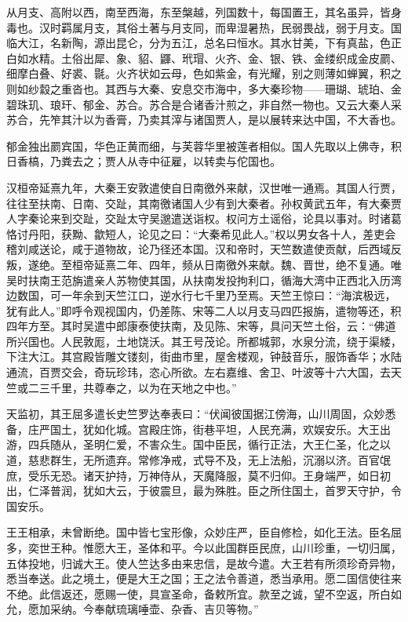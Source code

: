 \documentclass[12pt,UTF8]{ctexbook}
\begin{document}
从月支、高附以西，南至西海，东至槃越，列国数十，每国置王，其名虽异，皆身毒也。汉时羁属月支，其俗土著与月支同，而卑湿暑热，民弱畏战，弱于月支。国临大江，名新陶，源出昆仑，分为五江，总名曰恒水。其水甘美，下有真盐，色正白如水精。土俗出犀、象、貂、鼲、玳瑁、火齐、金、银、铁、金缕织成金皮罽、细摩白叠、好裘、毾。火齐状如云母，色如紫金，有光耀，别之则薄如蝉翼，积之则如纱縠之重沓也。其西与大秦、安息交市海中，多大秦珍物——珊瑚、琥珀、金碧珠玑、琅玕、郁金、苏合。苏合是合诸香汁煎之，非自然一物也。又云大秦人采苏合，先笮其汁以为香膏，乃卖其滓与诸国贾人，是以展转来达中国，不大香也。

郁金独出罽宾国，华色正黄而细，与芙蓉华里被莲者相似。国人先取以上佛寺，积日香槁，乃粪去之；贾人从寺中征雇，以转卖与佗国也。

汉桓帝延熹九年，大秦王安敦遣使自日南徼外来献，汉世唯一通焉。其国人行贾，往往至扶南、日南、交趾，其南徼诸国人少有到大秦者。孙权黄武五年，有大秦贾人字秦论来到交趾，交趾太守吴邈遣送诣权。权问方土谣俗，论具以事对。时诸葛恪讨丹阳，获黝、歙短人，论见之曰：“大秦希见此人。”权以男女各十人，差吏会稽刘咸送论，咸于道物故，论乃径还本国。汉和帝时，天竺数遣使贡献，后西域反叛，遂绝。至桓帝延熹二年、四年，频从日南徼外来献。魏、晋世，绝不复通。唯吴时扶南王范旃遣亲人苏物使其国，从扶南发投拘利口，循海大湾中正西北入历湾边数国，可一年余到天竺江口，逆水行七千里乃至焉。天竺王惊曰：“海滨极远，犹有此人。”即呼令观视国内，仍差陈、宋等二人以月支马四匹报旃，遣物等还，积四年方至。其时吴遣中郎康泰使扶南，及见陈、宋等，具问天竺土俗，云：“佛道所兴国也。人民敦厖，土地饶沃。其王号茂论。所都城郭，水泉分流，绕于渠緌，下注大江。其宫殿皆雕文镂刻，街曲市里，屋舍楼观，钟鼓音乐，服饰香华；水陆通流，百贾交会，奇玩珍玮，恣心所欲。左右嘉维、舍卫、叶波等十六大国，去天竺或二三千里，共尊奉之，以为在天地之中也。”

天监初，其王屈多遣长史竺罗达奉表曰：“伏闻彼国据江傍海，山川周固，众妙悉备，庄严国土，犹如化城。宫殿庄饰，街巷平坦，人民充满，欢娱安乐。大王出游，四兵随从，圣明仁爱，不害众生。国中臣民，循行正法，大王仁圣，化之以道，慈悲群生，无所遗弃。常修净戒，式导不及，无上法船，沉溺以济。百官氓庶，受乐无恐。诸天护持，万神侍从，天魔降服，莫不归仰。王身端严，如日初出，仁泽普润，犹如大云，于彼震旦，最为殊胜。臣之所住国土，首罗天守护，令国安乐。

王王相承，未曾断绝。国中皆七宝形像，众妙庄严，臣自修检，如化王法。臣名屈多，奕世王种。惟愿大王，圣体和平。今以此国群臣民庶，山川珍重，一切归属，五体投地，归诚大王。使人竺达多由来忠信，是故今遣。大王若有所须珍奇异物，悉当奉送。此之境土，便是大王之国；王之法令善道，悉当承用。愿二国信使往来不绝。此信返还，愿赐一使，具宣圣命，备敕所宜。款至之诚，望不空返，所白如允，愿加采纳。今奉献琉璃唾壶、杂香、吉贝等物。”
\end{document}
